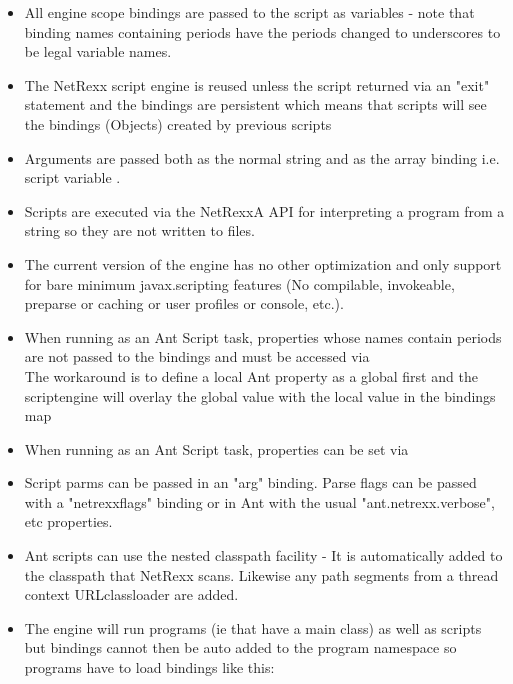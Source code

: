 \begin{itemize}
\item All engine scope bindings are passed to the script as variables - note that binding names containing periods have the periods changed to underscores to be legal variable names.
\item The NetRexx script engine is reused unless the script returned via an "exit" statement and the bindings are persistent which means that scripts will see the bindings (Objects) created by previous scripts
\item Arguments are passed both as the normal  string and as the array binding  i.e. script variable .
\item Scripts are executed via the NetRexxA API for interpreting a program from a string so they are not written to files.
\item The current version of the engine has no other optimization and
  only support for bare minimum javax.scripting  features (No compilable, invokeable, preparse or caching or user profiles or console, etc.).
\item When running as an Ant Script task, properties whose names
  contain periods are not passed to the bindings and must be accessed
  via \\
  The workaround is to define a local Ant property as a global first and the scriptengine will overlay the global value with the local value in the bindings map
\item When running as an Ant Script task, properties can be set via\\
\item Script parms can be passed in an "arg" binding. Parse flags can be passed with a "netrexxflags" binding or in Ant with the usual "ant.netrexx.verbose", etc properties.
\item Ant scripts can use the nested classpath facility - It is automatically added to the classpath that NetRexx scans. Likewise any path segments from a thread context URLclassloader are added.
\item The engine will run programs (ie that have a main class) as well as scripts but bindings cannot then be auto added to the program namespace so
programs have to load bindings like this:\\ 
\end{itemize}
